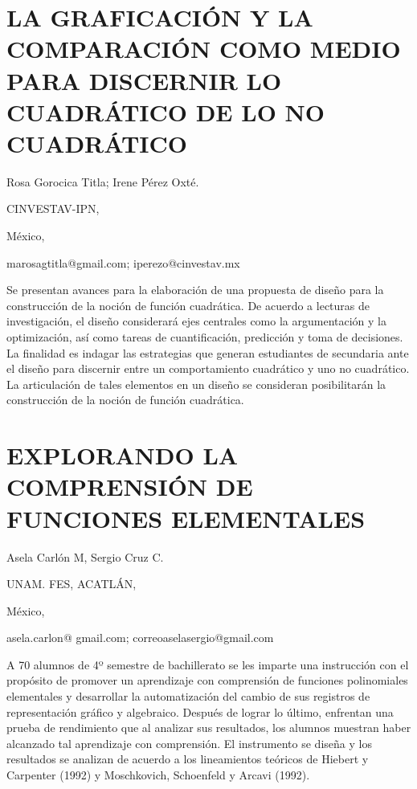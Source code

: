 \section{LA GRAFICACIÓN Y LA COMPARACIÓN COMO MEDIO PARA DISCERNIR LO CUADRÁTICO
DE LO NO CUADRÁTICO}

\begin{datos}

Rosa Gorocica Titla; Irene Pérez Oxté.

CINVESTAV-IPN,

México,

marosagtitla@gmail.com; iperezo@cinvestav.mx 

\end{datos}

Se presentan avances para la elaboración de una propuesta de diseño
para la construcción de la noción de función cuadrática. De acuerdo
a lecturas de investigación, el diseño considerará ejes centrales
como la argumentación y la optimización, así como tareas de cuantificación,
predicción y toma de decisiones. La finalidad es indagar las estrategias
que generan estudiantes de secundaria ante el diseño para discernir
entre un comportamiento cuadrático y uno no cuadrático. La articulación
de tales elementos en un diseño se consideran posibilitarán la construcción
de la noción de función cuadrática.


\section{EXPLORANDO LA COMPRENSIÓN DE FUNCIONES ELEMENTALES}

\begin{datos}

Asela Carlón M, Sergio Cruz C. 

UNAM. FES, ACATLÁN,

México,

asela.carlon@ gmail.com; correoaselasergio@gmail.com 

\end{datos}

A 70 alumnos de 4º semestre de bachillerato se les imparte una instrucción
con el propósito de promover un aprendizaje con comprensión de funciones
polinomiales elementales y desarrollar la automatización del cambio
de sus registros de representación gráfico y algebraico. Después de
lograr lo último, enfrentan una prueba de rendimiento que al analizar
sus resultados, los alumnos muestran haber alcanzado tal aprendizaje
con comprensión. El instrumento se diseña y los resultados se analizan
de acuerdo a los lineamientos teóricos de Hiebert y Carpenter (1992)
y Moschkovich, Schoenfeld y Arcavi (1992).

